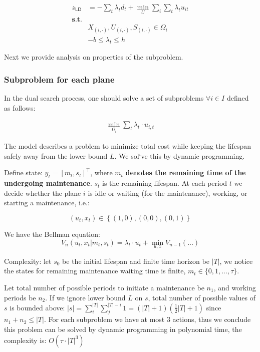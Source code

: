 \documentclass[
  a4paper,
,tablecaptionabove
]{scrartcl}
\numberwithin{equation}{section}
\begin{document}
\[\begin{aligned}
    z_{\mathsf{LD}} & = - \sum_t \lambda_t d_t  + \min_{U}\sum_i \sum_t\lambda_t u_{it} \\
    \mathbf {s.t. } &                                                                   \\
                    & X_{(i,\cdot)}, U_{(i,\cdot)}, S_{(i,\cdot)} \in \Omega_i          \\
                    & -b \le \lambda_t \le h
  \end{aligned}\]

Next we provide analysis on properties of the subproblem.

\hypertarget{sec:subproblem-for-each-plane}{%
  \subsubsection{Subproblem for each
    plane}\label{subproblem-for-each-plane}}

In the dual search process, one should solve a set of subproblems
\(\forall i\in I\) defined as follows:

\[\begin{aligned}
    \min_{\Omega_i} \sum_t \lambda_t \cdot u_{i,t}
  \end{aligned}\]

The model describes a problem to minimize total cost while keeping the
lifespan safely away from the lower bound \(L\). We sol‘ve this by
dynamic programming.

Define state: \(y_t = \left[m_t,s_t \right]^\top\), where \(m_t\)
\textbf{denotes the remaining time of the undergoing maintenance}.
\(s_t\) is the remaining lifespan. At each period \(t\) we decide
whether the plane \(i\) is idle or waiting (for the maintenance),
working, or starting a maintenance, i.e.:

\[(u_t, x_t) \in \left\{(1, 0), (0,0), (0, 1)\right\}\]

We have the Bellman equation:
\[V_n(u_t, x_t | m_t, s_t) = \lambda_t \cdot u_t + \min_{u,x} V_{n-1}(...)\]

Complexity: let \(s_0\) be the initial lifespan and finite time horizon
be \(|T|\), we notice the states for remaining maintenance waiting time
is finite, \(m_t \in \{0, 1, ..., \tau\}\).

Let total number of possible periods to initiate a maintenance be
\(n_1\), and working periods be \(n_2\). If we ignore lower bound \(L\)
on \(s\), total number of possible values of \(s\) is bounded above:
\(|s| = \sum_i^{|T|}\sum_j^{|T| - i} 1=(|T| + 1)(\frac{1}{2}|T| + 1)\)
since \(n_1 + n_2 \le |T|\). For each subproblem we have at most 3
actions, thus we conclude this problem can be solved by dynamic
programming in polynomial time, the complexity is:
\(O\left(\tau\cdot|T|^3 \right)\)
\end{document}
